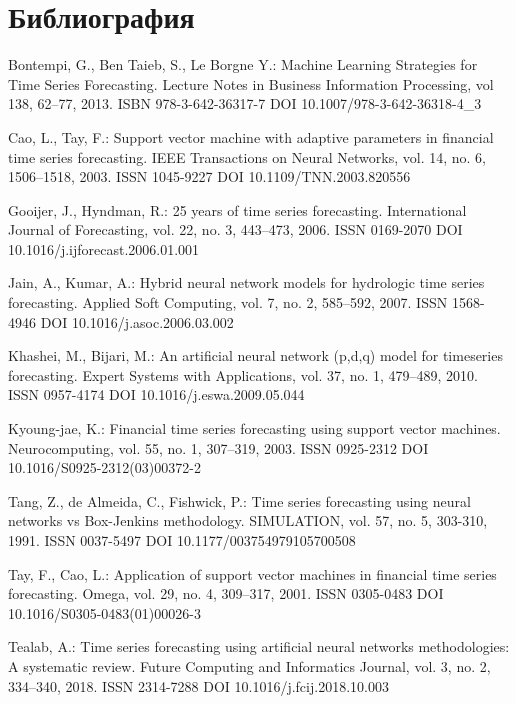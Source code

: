 \chapter*{Библиография}

\begin{thebibliography}{99.}

 Bontempi, G., Ben Taieb, S., Le Borgne Y.: Machine Learning Strategies for Time Series Forecasting. Lecture Notes in Business Information Processing, vol 138, 62--77, 2013. ISBN 978-3-642-36317-7 DOI 10.1007/978-3-642-36318-4\_3

 Cao, L., Tay, F.: Support vector machine with adaptive parameters in financial time series forecasting. IEEE Transactions on Neural Networks, vol. 14, no. 6, 1506--1518, 2003. ISSN 1045-9227 DOI 10.1109/TNN.2003.820556

 Gooijer, J., Hyndman, R.: 25 years of time series forecasting. International Journal of Forecasting, vol. 22, no. 3, 443--473, 2006. ISSN 0169-2070 DOI 10.1016/j.ijforecast.2006.01.001

 Jain, A., Kumar, A.: Hybrid neural network models for hydrologic time series forecasting. Applied Soft Computing, vol. 7, no. 2, 585--592, 2007. ISSN 1568-4946 DOI 10.1016/j.asoc.2006.03.002

 Khashei, M., Bijari, M.: An artificial neural network (p,d,q) model for timeseries forecasting. Expert Systems with Applications, vol. 37, no. 1, 479--489, 2010. ISSN 0957-4174 DOI 10.1016/j.eswa.2009.05.044

 Kyoung-jae, K.: Financial time series forecasting using support vector machines. Neurocomputing, vol. 55, no. 1, 307--319, 2003. ISSN 0925-2312 DOI 10.1016/S0925-2312(03)00372-2

 Tang, Z., de Almeida, C., Fishwick, P.: Time series forecasting using neural networks vs Box-Jenkins methodology. SIMULATION, vol. 57, no. 5, 303-310, 1991. ISSN 0037-5497 DOI 10.1177/003754979105700508

 Tay, F., Cao, L.: Application of support vector machines in financial time series forecasting. Omega, vol. 29, no. 4, 309--317, 2001. ISSN 0305-0483 DOI 10.1016/S0305-0483(01)00026-3

 Tealab, A.: Time series forecasting using artificial neural networks methodologies: A systematic review. Future Computing and Informatics Journal, vol. 3, no. 2, 334--340, 2018. ISSN 2314-7288 DOI 10.1016/j.fcij.2018.10.003


\end{thebibliography}
